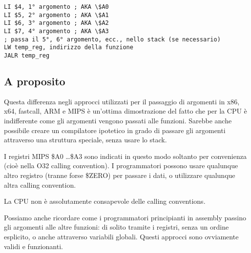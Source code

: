 \begin{lstlisting}[caption=MIPS (O32 calling convention),style=customasmMIPS]
LI $4, 1° argomento ; AKA \$A0
LI $5, 2° argomento ; AKA \$A1
LI $6, 3° argomento ; AKA \$A2
LI $7, 4° argomento ; AKA \$A3
; passa il 5°, 6° argomento, ecc., nello stack (se necessario)
LW temp_reg, indirizzo della funzione
JALR temp_reg
\end{lstlisting}

\subsection{A proposito}

Questa differenza negli approcci utilizzati per il passaggio di argomenti in x86, x64,
fastcall, ARM e MIPS è un'ottima dimostrazione del fatto che per la CPU è indifferente come gli argomenti vengono passati alle funzioni.
Sarebbe anche possibile creare un compilatore ipotetico in grado di passare gli argomenti
attraverso una struttura speciale, senza usare lo stack.

I registri MIPS \$A0 \dots \$A3 sono indicati in questo modo soltanto per convenienza (cioè nella O32 calling convention).
I programmatori possono usare qualunque altro registro (tranne forse \$ZERO)
per passare i dati, o utilizzare qualunque altra calling convention.

La \ac{CPU} non è assolutamente consapevole delle calling conventions.

Possiamo anche ricordare come i programmatori principianti in assembly passino gli argomenti alle altre funzioni:
di solito tramite i registri, senza un ordine esplicito, o anche attraverso variabili globali.
Questi approcci sono ovviamente validi e funzionanti.
